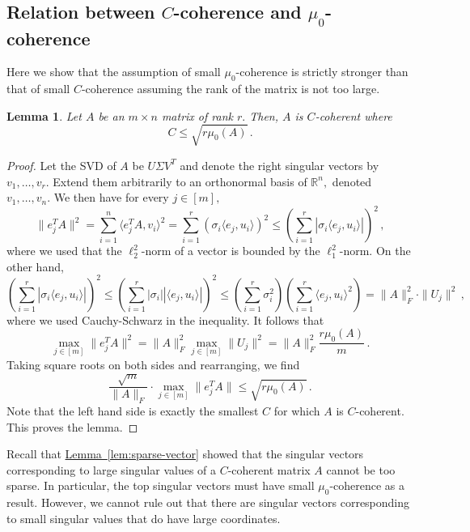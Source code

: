 \documentclass[letterpaper,11pt]{article}
\newtheorem{lemma}[theorem]{Lemma}
\theoremstyle{definition}
\newcommand{\equationlabel}[1]{\label{eq:#1}}
\newcommand{\lemmaref}[1]{\hyperref[lem:#1]{Lemma~\ref{lem:#1}}}
\newcommand{\sectionlabel}[1]{\label{sec:#1}}
\newcommand{\mper}{\,.}
\newcommand{\mcom}{\,,}
\renewcommand{\le}{\leqslant}
\newcommand{\R}{\mathbb{R}}
\begin{document}
\subsection{Relation between $C$-coherence and $\mu_0$-coherence}
\sectionlabel{relation}

Here we show that the assumption of small $\mu_0$-coherence is strictly
stronger than that of small $C$-coherence assuming the rank of the matrix is
not too large.

\begin{lemma}
Let $A$ be an $m\times n$ matrix of rank $r.$ Then, $A$ is $C$-coherent where
\[
C \le \sqrt{r\mu_0(A)}\mper
\]
\end{lemma}
\begin{proof}
Let the SVD of $A$ be $U\Sigma V^T$ and denote the right singular vectors by
$v_1,\dots,v_r.$ Extend them arbitrarily to an orthonormal basis of $\R^n,$
denoted $v_1,\dots,v_n.$ We then have for every $j\in[m],$
\begin{equation}\equationlabel{ejTA}
\|e_j^TA\|^2
 =
\sum_{i=1}^n\langle e_j^TA,v_i\rangle^2
 =
 \sum_{i=1}^r \left(\sigma_i\langle e_j, u_i\rangle\right)^2
 \le
\left(\sum_{i=1}^r \left|\sigma_i\langle e_j, u_i\rangle\right|\right)^2\mcom
\end{equation}
where we used that the $\ell_2^2$-norm of a vector is bounded by the
$\ell_1^2$-norm. On the other hand,
\begin{equation}
\left(\sum_{i=1}^r \left|\sigma_i\langle e_j, u_i\rangle\right|\right)^2
\le
\left(\sum_{i=1}^r \left|\sigma_i\right|\left|\langle e_j, u_i\rangle\right|\right)^2
\le
\left(\sum_{i=1}^r\sigma_i^2\right)\left(\sum_{i=1}^r \langle
e_j,u_i\rangle^2\right)
= \|A\|_F^2\cdot\|U_{j}\|^2\mcom
\end{equation}
where we used Cauchy-Schwarz in the inequality. It follows that
\[
\max_{j\in[m]}\|e_j^TA\|^2
= \|A\|_F^2 \max_{j\in[m]} \|U_{j}\|^2
= \|A\|_F^2 \frac{r\mu_0(A)}{m}
\mper
\]
Taking square roots on both sides and rearranging, we find
\[
\frac{\sqrt{m}}{\|A\|_F}\cdot \max_{j\in[m]}\|e_j^TA\|
\le \sqrt{r\mu_0(A)}\mper
\]
Note that the left hand side is exactly the smallest $C$ for which $A$ is
$C$-coherent. This proves the lemma.
\end{proof}

Recall that \lemmaref{sparse-vector} showed that the singular vectors
corresponding to large singular values of a $C$-coherent matrix $A$ cannot be
too sparse. In particular, the top singular vectors must have
small $\mu_0$-coherence as a result. However, we cannot rule out that there
are singular vectors corresponding to small singular values that do have
large coordinates.
\end{document}

